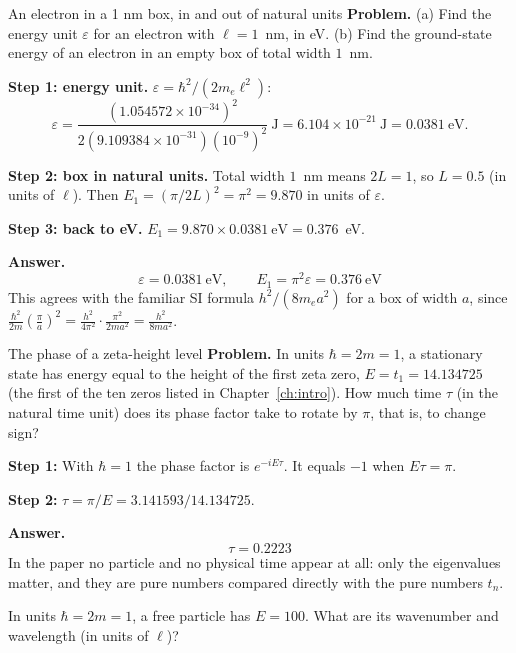 \begin{sample}{An electron in a 1 nm box, in and out of natural units}
\textbf{Problem.} (a) Find the energy unit $\varepsilon$ for an electron with $\ell=1$~nm, in eV. (b) Find the ground-state energy of an electron in an empty box of total width $1$~nm.

\textbf{Step 1: energy unit.} $\varepsilon=\hbar^2/(2m_e\ell^2)$:
\[
\varepsilon=\frac{(1.054572\times10^{-34})^2}{2(9.109384\times10^{-31})(10^{-9})^2}~\text{J}=6.104\times10^{-21}~\text{J}=0.0381~\text{eV}.
\]

\textbf{Step 2: box in natural units.} Total width $1$~nm means $2L=1$, so $L=0.5$ (in units of $\ell$). Then $E_1=(\pi/2L)^2=\pi^2=9.870$ in units of $\varepsilon$.

\textbf{Step 3: back to eV.} $E_1=9.870\times0.0381~\text{eV}=0.376$~eV.

\textbf{Answer.} \[\boxed{\varepsilon=0.0381~\text{eV},\qquad E_1=\pi^2\varepsilon=0.376~\text{eV}}\]
This agrees with the familiar SI formula $h^2/(8m_ea^2)$ for a box of width $a$, since $\frac{\hbar^2}{2m}\left(\frac{\pi}{a}\right)^2=\frac{h^2}{4\pi^2}\cdot\frac{\pi^2}{2ma^2}=\frac{h^2}{8ma^2}$.
\end{sample}

\begin{sample}{The phase of a zeta-height level}
\textbf{Problem.} In units $\hbar=2m=1$, a stationary state has energy equal to the height of the first zeta zero, $E=t_1=14.134725$ (the first of the ten zeros listed in Chapter~\ref{ch:intro}). How much time $\tau$ (in the natural time unit) does its phase factor take to rotate by $\pi$, that is, to change sign?

\textbf{Step 1:} With $\hbar=1$ the phase factor is $e^{-iE\tau}$. It equals $-1$ when $E\tau=\pi$.

\textbf{Step 2:} $\tau=\pi/E=3.141593/14.134725$.

\textbf{Answer.} \[\boxed{\tau=0.2223}\]
In the paper no particle and no physical time appear at all: only the eigenvalues matter, and they are pure numbers compared directly with the pure numbers $t_n$.
\end{sample}

\begin{checkpoint}
In units $\hbar=2m=1$, a free particle has $E=100$. What are its wavenumber and wavelength (in units of $\ell$)?
\end{checkpoint}

